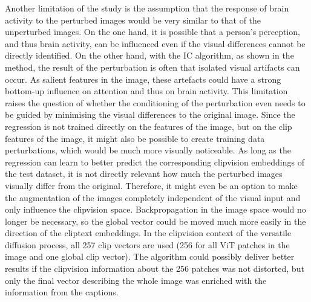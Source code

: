 Another limitation of the study is the assumption that the response of brain activity to the perturbed images would be very similar to that of the unperturbed images. On the one hand, it is possible that a person's perception, and thus brain activity, can be influenced even if the visual differences cannot be directly identified\cite{rensinkVisualSensingSeeing2004}. On the other hand, with the IC algorithm, as shown in the method, the result of the perturbation is often that isolated visual artifacts can occur. As salient features in the image, these artefacts could have a strong bottom-up influence on attention and thus on brain activity\cite{wolfeFiveFactorsThat2017}. This limitation raises the question of whether the conditioning of the perturbation even needs to be guided by minimising the visual differences to the original image. Since the regression is not trained directly on the features of the image, but on the clip features of the image, it might also be possible to create training data perturbations, which would be much more visually noticeable. As long as the regression can learn to better predict the corresponding clipvision embeddings of the test dataset, it is not directly relevant how much the perturbed images visually differ from the original. Therefore, it might even be an option to make the augmentation of the images completely independent of the visual input and only influence the clipvision space. Backpropagation in the image space would no longer be necessary, so the global vector could be moved much more easily in the direction of the cliptext embeddings. In the clipvision context of the versatile diffusion process, all 257 clip vectors are used (256 for all ViT patches in the image and one global clip vector). The algorithm could possibly deliver better results if the clipvision information about the 256 patches was not distorted, but only the final vector describing the whole image was enriched with the information from the captions. 




